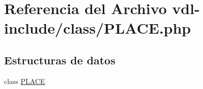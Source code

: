 \hypertarget{PLACE_8php}{\section{Referencia del Archivo vdl-\/include/class/\-P\-L\-A\-C\-E.php}
\label{PLACE_8php}
}
\subsection*{Estructuras de datos}
\begin{DoxyCompactItemize}
\item 
class \hyperlink{classPLACE}{P\-L\-A\-C\-E}
\end{DoxyCompactItemize}

